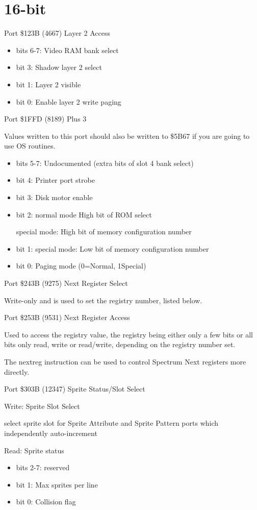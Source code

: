 \section{16-bit}
Port \$123B (4667) Layer 2 Access
\begin{itemize}
  \item[] bits 6-7: Video RAM bank select
  \item[] bit 3: Shadow layer 2 select
  \item[] bit 1: Layer 2 visible
  \item[] bit 0: Enable layer 2 write paging
\end{itemize}

Port \$1FFD (8189) Plus 3

Values written to this port should also be written to \$5B67 if you
are going to use OS routines.
\begin{itemize}
\item[] bits 5-7: Undocumented (extra bits of slot 4 bank select)
\item[] bit 4: Printer port strobe
\item[] bit 3: Disk motor enable
\item[] bit 2:
  normal mode High bit of ROM select
  
  special mode: High bit of memory configuration number
\item[] bit 1:
  special mode: Low bit of memory configuration number
\item[] bit 0: Paging mode (0=Normal, 1Special)
\end{itemize}

Port \$243B (9275) Next Register Select

Write-only and is used to set the registry number, listed below.

Port \$253B (9531) Next Register Access

Used to access the registry value, the registry being either only a
few bits or all bits only read, write or read/write, depending on the
registry number set.

The nextreg instruction can be used to control Spectrum Next registers
more directly.

Port \$303B (12347) Sprite Status/Slot Select

Write: Sprite Slot Select

select sprite slot for Sprite Attribute and Sprite Pattern ports which
independently auto-increment

Read: Sprite status
\begin{itemize}
\item[] bits 2-7: reserved
\item[] bit 1: Max sprites per line
\item[] bit 0: Collision flag
\end{itemize}

